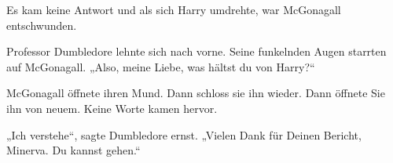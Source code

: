 Es kam keine Antwort und als sich Harry umdrehte, war McGonagall entschwunden.


Professor Dumbledore lehnte sich nach vorne. Seine funkelnden Augen starrten auf McGonagall. „Also, meine Liebe, was hältst du von Harry?“

McGonagall öffnete ihren Mund. Dann schloss sie ihn wieder. Dann öffnete Sie ihn von neuem. Keine Worte kamen hervor.

„Ich verstehe“, sagte Dumbledore ernst. „Vielen Dank für Deinen Bericht, Minerva. Du kannst gehen.“

